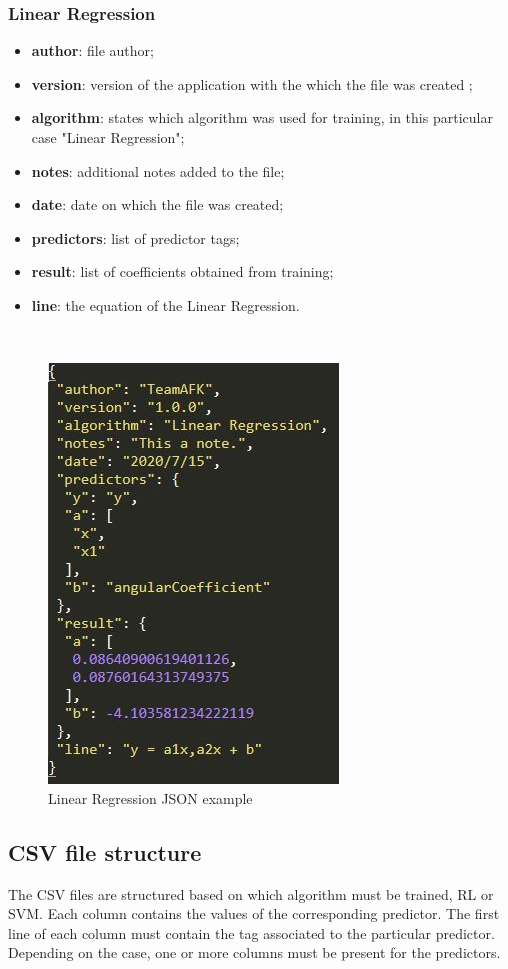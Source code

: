 \subsubsection{Linear Regression}
\begin{itemize}
	\item \textbf{author}: file author;
	\item \textbf{version}: version of the application with the which the file was created ;
	\item \textbf{algorithm}: states which algorithm was used for training, in this particular case "Linear Regression";
	\item \textbf{notes}: additional notes added to the file;
	\item \textbf{date}: date on which the file was created;
	\item \textbf{predictors}:  list of predictor tags;
	\item \textbf{result}: list of coefficients obtained from training;
	\item \textbf{line}: the equation of the Linear Regression.
\end{itemize}
\hspace{5cm}\\
\begin{figure}[H]
\centering
\includegraphics[scale=0.75]{img/json/jsonRL.JPG}
\caption{Linear Regression JSON example}
\end{figure}
\pagebreak

\subsection{CSV file structure}
The CSV files are structured based on which algorithm must be trained, RL or SVM.
Each column contains the values of the corresponding predictor\glo. The first line  of each column must contain the tag associated to the particular predictor. Depending on the case, one or more columns must be present for the predictors.

